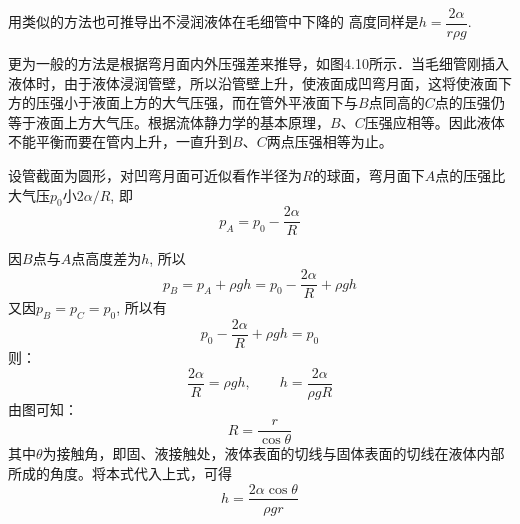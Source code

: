用类似的方法也可推导出不浸润液体在毛细管中下降的
高度同样是$h=\dfrac{2\alpha}{r\rho g}$.

更为一般的方法是根据弯月面内外压强差来推导，如图4.10所示．当毛细管刚插入液体时，由于液体浸润管壁，所以沿管壁上升，使液面成凹弯月面，这将使液面下方的压强小于液面上方的大气压强，而在管外平液面下与$B$点同高的$C$点的压强仍等于液面上方大气压。根据流体静力学的基本原理，$B$、$C$压强应相等。因此液体不能平衡而要在管内上升，一直升到$B$、$C$两点压强相等为止。

设管截面为圆形，对凹弯月面可近似看作半径为$R$的球面，弯月面下$A$点的压强比大气压$p_0$小$2\alpha/R$, 即
\[p_A=p_0-\frac{2\alpha}{R}\]

因$B$点与$A$点高度差为$h$, 所以
\[p_B=p_A+\rho gh=p_0-\frac{2\alpha}{R}+\rho gh\]
又因$p_B=p_C=p_0$, 所以有
\[p_0-\frac{2\alpha}{R}+\rho gh=p_0\]
则：
\[\frac{2\alpha}{R}=\rho gh,\qquad h=\frac{2\alpha}{\rho gR}\]
由图可知：
\[R=\frac{r}{\cos\theta}\]
其中$\theta$为接触角，即固、液接触处，液体表面的切线与固体表面的切线在液体内部所成的角度。将本式代入上式，可得
\[h=\frac{2\alpha\cos\theta}{\rho gr}\]

